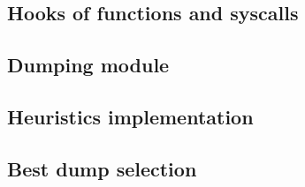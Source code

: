 \subsection{Hooks of functions and syscalls}
\label{Hooks of functions and syscalls}

\subsection{Dumping module}
\label{Dumping module}

\subsection{Heuristics implementation}
\label{Heuristics implementation}

\subsection{Best dump selection}
\label{Best dump selection}